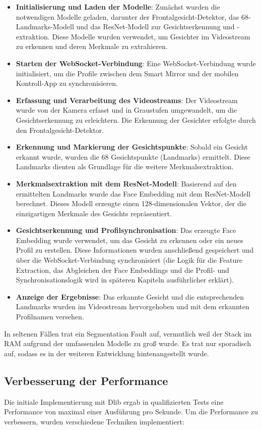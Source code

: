\begin{itemize}
    \item \textbf{Initialisierung und Laden der Modelle}: Zunächst wurden die notwendigen Modelle geladen, darunter der Frontalgesicht-Detektor, das 68-Landmarks-Modell und das ResNet-Modell zur Gesichtserkennung und -extraktion. Diese Modelle wurden verwendet, um Gesichter im Videostream zu erkennen und deren Merkmale zu extrahieren.
    \item \textbf{Starten der WebSocket-Verbindung}: Eine WebSocket-Verbindung wurde initialisiert, um die Profile zwischen dem Smart Mirror und der mobilen Kontroll-App zu synchronisieren.
    \item \textbf{Erfassung und Verarbeitung des Videostreams}: Der Videostream wurde von der Kamera erfasst und in Graustufen umgewandelt, um die Gesichtserkennung zu erleichtern. Die Erkennung der Gesichter erfolgte durch den Frontalgesicht-Detektor.
    \item \textbf{Erkennung und Markierung der Gesichtspunkte}: Sobald ein Gesicht erkannt wurde, wurden die 68 Gesichtspunkte (Landmarks) ermittelt. Diese Landmarks dienten als Grundlage für die weitere Merkmalsextraktion.
    \item \textbf{Merkmalsextraktion mit dem ResNet-Modell}: Basierend auf den ermittelten Landmarks wurde das Face Embedding mit dem ResNet-Modell berechnet. Dieses Modell erzeugte einen 128-dimensionalen Vektor, der die einzigartigen Merkmale des Gesichts repräsentiert.
    \item \textbf{Gesichtserkennung und Profilsynchronisation}: Das erzeugte Face Embedding wurde verwendet, um das Gesicht zu erkennen oder ein neues Profil zu erstellen. Diese Informationen wurden anschließend gespeichert und über die WebSocket-Verbindung synchronisiert (die Logik für die Feature Extraction, das Abgleichen der Face Embeddings und die Profil- und Synchronisationslogik wird in späteren Kapiteln ausführlicher erklärt).
    \item \textbf{Anzeige der Ergebnisse}: Das erkannte Gesicht und die entsprechenden Landmarks wurden im Videostream hervorgehoben und mit dem erkannten Profilnamen versehen.
\end{itemize}

\noindent In seltenen Fällen trat ein Segmentation Fault auf, vermutlich weil der Stack im RAM aufgrund der umfassenden Modelle zu groß wurde. Es trat nur sporadisch auf, sodass es in der weiteren Entwicklung hintenangestellt wurde.


\subsection{Verbesserung der Performance}
Die initiale Implementierung mit Dlib ergab in qualifizierten Tests eine Performance von maximal einer Ausführung pro Sekunde. Um die Performance zu verbessern, wurden verschiedene Techniken implementiert:

